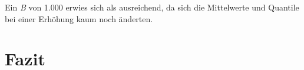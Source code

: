 \documentclass{Vorlage}
\begin{document}
Ein \textit{B} von 1.000 erwies sich als ausreichend, da sich die Mittelwerte und Quantile bei einer Erhöhung kaum noch änderten.


\section{Fazit}

\clearpage



 





\clearpage

\end{document}
